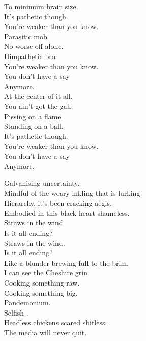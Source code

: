 To minimum brain size. \\

It's pathetic though. \\
You're weaker than you know. \\
Parasitic mob. \\
No worse off alone. \\
Himpathetic bro. \\
You're weaker than you know. \\
You don't have a say \\
Anymore. \\

At the center of it all. \\
You ain't got the gall. \\
Pissing on a flame. \\
Standing on a ball. \\
It's pathetic though. \\
You're weaker than you know. \\
You don't have a say \\
Anymore. \\





Galvanising uncertainty. \\
Mindful of the weary inkling that is lurking. \\
Hierarchy, it's been cracking aegis. \\
Embodied in this black heart shameless. \\

Straws in the wind. \\
Is it all ending? \\
Straws in the wind. \\
Is it all ending? \\
Like a blunder brewing full to the brim. \\
I can see the  Cheshire grin. \\

Cooking something raw. \\
Cooking something big. \\
Pandemonium. \\
Selfish . \\
Headless chickens scared shitless. \\
The media will never quit. \\

